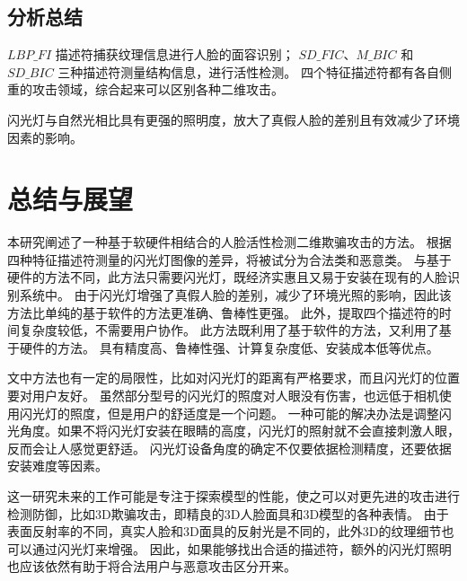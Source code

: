 \documentclass[conference]{IEEEtran}
\begin{document}
\subsection{分析总结}
$LBP \_ FI$ 描述符捕获纹理信息进行人脸的面容识别；
$SD \_ FIC$、$M \_ BIC$ 和 $SD \_ BIC$ 三种描述符测量结构信息，进行活性检测。
四个特征描述符都有各自侧重的攻击领域，综合起来可以区别各种二维攻击。

闪光灯与自然光相比具有更强的照明度，放大了真假人脸的差别且有效减少了环境因素的影响。


\section{总结与展望}

本研究阐述了一种基于软硬件相结合的人脸活性检测二维欺骗攻击的方法。
根据四种特征描述符测量的闪光灯图像的差异，将被试分为合法类和恶意类。
与基于硬件的方法不同，此方法只需要闪光灯，既经济实惠且又易于安装在现有的人脸识别系统中。
由于闪光灯增强了真假人脸的差别，减少了环境光照的影响，因此该方法比单纯的基于软件的方法更准确、鲁棒性更强。
此外，提取四个描述符的时间复杂度较低，不需要用户协作。
此方法既利用了基于软件的方法，又利用了基于硬件的方法。
具有精度高、鲁棒性强、计算复杂度低、安装成本低等优点。

文中方法也有一定的局限性，比如对闪光灯的距离有严格要求，而且闪光灯的位置要对用户友好。
虽然部分型号的闪光灯的照度对人眼没有伤害，也远低于相机使用闪光灯的照度，但是用户的舒适度是一个问题。
一种可能的解决办法是调整闪光角度。如果不将闪光灯安装在眼睛的高度，闪光灯的照射就不会直接刺激人眼，反而会让人感觉更舒适。
闪光灯设备角度的确定不仅要依据检测精度，还要依据安装难度等因素。

这一研究未来的工作可能是专注于探索模型的性能，使之可以对更先进的攻击进行检测防御，比如3D欺骗攻击，即精良的3D人脸面具和3D模型的各种表情。
由于表面反射率的不同，真实人脸和3D面具的反射光是不同的，此外3D的纹理细节也可以通过闪光灯来增强。
因此，如果能够找出合适的描述符，额外的闪光灯照明也应该依然有助于将合法用户与恶意攻击区分开来。
\end{document}
